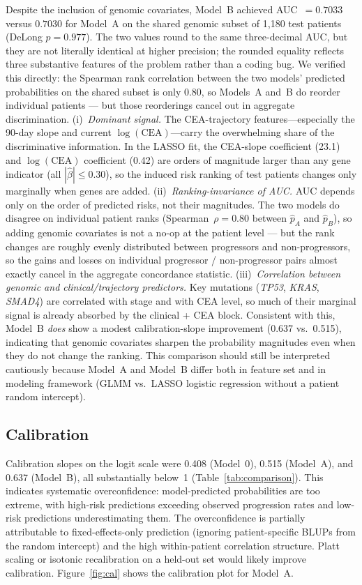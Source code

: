 \documentclass[11pt]{article}
\begin{document}
Despite the inclusion of genomic covariates, Model~B achieved AUC~$= 0.7033$ versus $0.7030$ for Model~A on the shared genomic subset of 1{,}180 test patients (DeLong $p = 0.977$). The two values round to the same three-decimal AUC, but they are not literally identical at higher precision; the rounded equality reflects three substantive features of the problem rather than a coding bug. We verified this directly: the Spearman rank correlation between the two models' predicted probabilities on the shared subset is only 0.80, so Models~A and~B do reorder individual patients --- but those reorderings cancel out in aggregate discrimination. (i)~\emph{Dominant signal.} The CEA-trajectory features---especially the 90-day slope and current $\log(\text{CEA})$---carry the overwhelming share of the discriminative information. In the LASSO fit, the CEA-slope coefficient (23.1) and $\log(\text{CEA})$ coefficient (0.42) are orders of magnitude larger than any gene indicator (all $|\hat{\beta}| \leq 0.30$), so the induced risk ranking of test patients changes only marginally when genes are added. (ii)~\emph{Ranking-invariance of AUC.} AUC depends only on the order of predicted risks, not their magnitudes. The two models do disagree on individual patient ranks (Spearman~$\rho = 0.80$ between $\hat{p}_A$ and $\hat{p}_B$), so adding genomic covariates is not a no-op at the patient level --- but the rank changes are roughly evenly distributed between progressors and non-progressors, so the gains and losses on individual progressor / non-progressor pairs almost exactly cancel in the aggregate concordance statistic. (iii)~\emph{Correlation between genomic and clinical/trajectory predictors.} Key mutations (\textit{TP53}, \textit{KRAS}, \textit{SMAD4}) are correlated with stage and with CEA level, so much of their marginal signal is already absorbed by the clinical + CEA block. Consistent with this, Model~B \emph{does} show a modest calibration-slope improvement (0.637 vs.\ 0.515), indicating that genomic covariates sharpen the probability magnitudes even when they do not change the ranking. This comparison should still be interpreted cautiously because Model~A and Model~B differ both in feature set and in modeling framework (GLMM vs.\ LASSO logistic regression without a patient random intercept).

\subsection*{Calibration}

Calibration slopes on the logit scale were 0.408 (Model~0), 0.515 (Model~A), and 0.637 (Model~B), all substantially below~1 (Table~\ref{tab:comparison}). This indicates systematic overconfidence: model-predicted probabilities are too extreme, with high-risk predictions exceeding observed progression rates and low-risk predictions underestimating them. The overconfidence is partially attributable to fixed-effects-only prediction (ignoring patient-specific BLUPs from the random intercept) and the high within-patient correlation structure. Platt scaling or isotonic recalibration on a held-out set would likely improve calibration. Figure~\ref{fig:cal} shows the calibration plot for Model~A.
\end{document}
